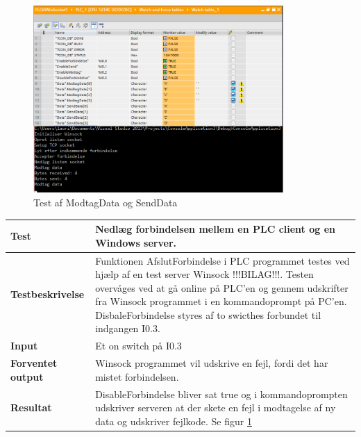 \begin{figure}[H] %
	\centering
	\includegraphics[width=0.85\textwidth]{Test/ModultestStyringsenhed/ModtagDataOgSendData}
	\caption{Test af ModtagData og SendData}
	\label{fig:ModtagDataOgSendData}
\end{figure}

\begin{center}
	\begin{tabular}{ | m{} | m{}|} 
		\hline
		\textbf{Test}					&Nedlæg forbindelsen mellem en PLC client og en Windows server.\\ \hline
		\textbf{Testbeskrivelse}		&Funktionen AfslutForbindelse i PLC programmet testes ved hjælp af en test server Winsock !!!BILAG!!!. Testen overvåges ved at gå online på PLC'en og gennem udskrifter fra Winsock programmet i en kommandoprompt på PC'en. DisbaleForbindelse styres af to swicthes forbundet til indgangen I0.3. \\ \hline
		\textbf{Input}					& Et on switch på I0.3\\ \hline
		\textbf{Forventet output}		&Winsock programmet vil udskrive en fejl, fordi det har mistet forbindelsen. \\ \hline
		\textbf{Resultat}				&DisableForbindelse bliver sat true og i kommandoprompten udskriver serveren at der skete en fejl i modtagelse af ny data og udskriver fejlkode. Se figur \ref{fig:ModtagDataOgSendData} \\ \hline
	\end{tabular}
\end{center}

